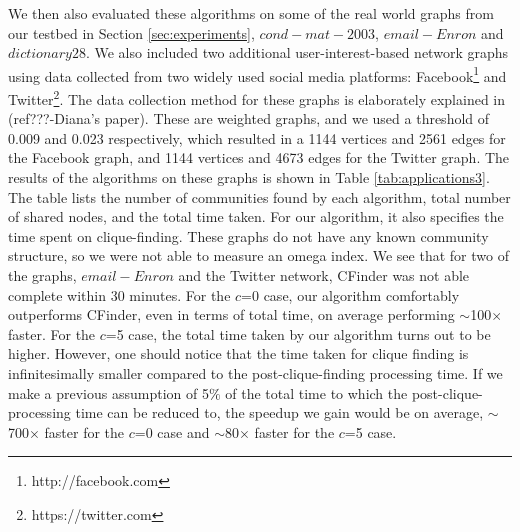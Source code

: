We then also evaluated these algorithms on some of the real world graphs from our testbed in Section \ref{sec:experiments}, $cond-mat-2003$, $email-Enron$ and $dictionary28$. We also included two additional user-interest-based network graphs using data collected from two widely used social media platforms: Facebook\footnote{http://facebook.com} and Twitter\footnote{https://twitter.com}. The data collection method for these graphs is elaborately explained in (ref???-Diana's paper). These are weighted graphs, and we used a threshold of 0.009 and 0.023 respectively, which resulted in a 1144 vertices and 2561 edges for the Facebook graph, and 1144 vertices and 4673 edges for the Twitter graph. 
The results of the algorithms on these graphs is shown in Table \ref{tab:applications3}. The table lists the number of communities found by each algorithm, total number of shared nodes, and the total time taken. For our algorithm, it also specifies the time spent on clique-finding. These graphs do not have any known community structure, so we were not able to measure an omega index. We see that for two of the graphs, $email-Enron$ and the Twitter network, CFinder was not able complete within 30 minutes. For the $c$=0 case, our algorithm comfortably outperforms CFinder, even in terms of total time, on average performing $\sim$100$\times$ faster. For the $c$=5 case, the total time taken by our algorithm turns out to be higher. However, one should notice that the time taken for clique finding is infinitesimally smaller compared to the post-clique-finding processing time. If we make a previous assumption of 5$\%$ of the total time to which the post-clique-processing time can be reduced to, the speedup we gain would be on average, $\sim$700$\times$ faster for the $c$=0 case and $\sim$80$\times$ faster for the $c$=5 case.













